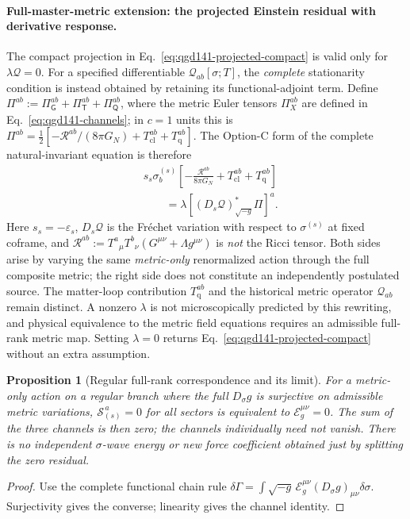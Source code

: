 \documentclass[11pt,a4paper]{article}
\newtheorem{proposition}[theorem]{Proposition}
\begin{document}
\paragraph{Full-master-metric extension: the projected Einstein residual with derivative response.}
The compact projection in Eq.~\eqref{eq:qgd141-projected-compact}
is valid only for $\lambda\mathcal Q=0$. For a specified differentiable
$\mathcal Q_{ab}[\sigma;T]$, the \emph{complete} stationarity condition
is instead obtained by retaining its functional-adjoint term. Define
$\Pi^{ab}:=\Pi_{\mathsf G}^{ab}+\Pi_{\mathsf T}^{ab}+\Pi_{\mathsf Q}^{ab}$,
where the metric Euler tensors $\Pi_X^{ab}$ are defined in
Eq.~\eqref{eq:qgd141-channels}; in $c=1$ units this is
$\Pi^{ab}=\frac12[-\mathcal R^{ab}/(8\pi G_N)
+T_{\mathrm{cl}}^{ab}+T_{\mathrm q}^{ab}]$.
The Option-C form of the complete natural-invariant equation is therefore
\begin{equation}\label{eq:qgd141-full-projected-einstein}
\boxed{\begin{aligned}
&s_s\sigma_b^{(s)}\left[
-\frac{\mathcal R^{ab}}{8\pi G_N}
+T_{\mathrm{cl}}^{ab}+T_{\mathrm q}^{ab}
\right]\\[4pt]
&\qquad=\lambda\left[
(D_s\mathcal Q)^*_{\sqrt{-g}}\Pi\right]^a.
\end{aligned}}
\end{equation}
Here $s_s=-\varepsilon_s$, $D_s\mathcal Q$ is the Fr\'echet
variation with respect to $\sigma^{(s)}$ at fixed coframe, and
$\mathcal R^{ab}:=T^a{}_{\mu}T^b{}_{\nu}
(G^{\mu\nu}+\Lambda g^{\mu\nu})$ is \emph{not} the Ricci tensor.
Both sides arise by varying the same \emph{metric-only} renormalized
action through the full composite metric; the right side does not
constitute an independently postulated source. The matter-loop
contribution $T_{\mathrm q}^{ab}$ and the historical metric operator
$\mathcal Q_{ab}$ remain distinct. A nonzero $\lambda$ is not
microscopically predicted by this rewriting, and physical equivalence
to the metric field equations requires an admissible full-rank metric map.
Setting $\lambda=0$ returns Eq.~\eqref{eq:qgd141-projected-compact}
without an extra assumption.

\begin{proposition}[Regular full-rank correspondence and its limit]
\label{prop:qgd141-rank}
For a metric-only action on a regular branch where the full
$D_\sigma g$ is surjective on admissible metric variations,
$\mathscr S_{(s)}^{\,a}=0$ for all sectors is equivalent to
$\mathcal E_g^{\mu\nu}=0$. The sum of the three channels is then zero;
the channels individually need not vanish. There is no independent
$\sigma$-wave energy or new force coefficient obtained just by
splitting the zero residual.
\end{proposition}
\begin{proof}
Use the complete functional chain rule
$\delta\Gamma=\int\sqrt{-g}\,\mathcal E_g^{\mu\nu}
(D_\sigma g)_{\mu\nu}\delta\sigma$.
Surjectivity gives the converse; linearity gives the channel identity.
\end{proof}
\end{document}
